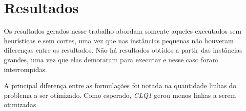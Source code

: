 \documentclass[12pt]{article}
\begin{document}
\section{Resultados}

Os resultados gerados nesse trabalho abordam somente aqueles executados sem heurísticas e sem cortes, uma vez que nas instâncias pequenas não houveram diferenças entre os resultados. Não há resultados obtidos a partir das instâncias grandes, uma vez que elas demoraram para executar e nesse caso foram interrompidas.

A principal diferença entre as formulações foi notada na quantidade linhas do problema a ser otimizado. Como esperado, \textsl{CLQ1} gerou menos linhas a serem otimizadas
\end{document}
